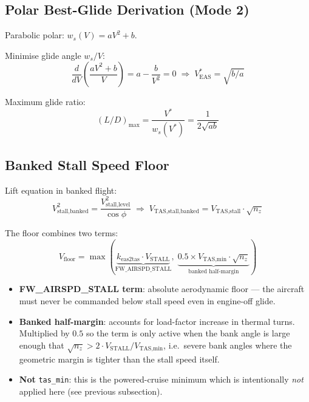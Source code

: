 \documentclass[12pt,a4paper]{article}
\begin{document}
\subsection{Polar Best-Glide Derivation (Mode 2)}

Parabolic polar: $w_s(V) = aV^2 + b$.

Minimise glide angle $w_s/V$:
\begin{equation}
  \frac{d}{dV}\!\left(\frac{aV^2+b}{V}\right) = a - \frac{b}{V^2} = 0
  \;\Rightarrow\;
  \boxed{V^*_{\text{EAS}} = \sqrt{b/a}}
\end{equation}

Maximum glide ratio:
\begin{equation}
  (L/D)_{\max} = \frac{V^*}{w_s(V^*)} = \frac{1}{2\sqrt{ab}}
\end{equation}

\subsection{Banked Stall Speed Floor}

Lift equation in banked flight:
\begin{equation}
  V^2_{\text{stall,banked}} = \frac{V^2_{\text{stall,level}}}{\cos\phi}
  \;\Rightarrow\;
  V_{\text{TAS,stall,banked}} = V_{\text{TAS,stall}} \cdot \sqrt{n_z}
\end{equation}

The floor combines two terms:
\begin{equation}
  V_{\text{floor}} = \max\!\left(
      \underbrace{k_{\text{eas2tas}} \cdot V_{\text{STALL}}}_{\text{FW\_AIRSPD\_STALL}},\;
      \underbrace{0.5 \times V_{\text{TAS,min}} \cdot \sqrt{n_z}}_{\text{banked half-margin}}
  \right)
\end{equation}

\begin{itemize}
  \item \textbf{FW\_AIRSPD\_STALL term}: absolute aerodynamic floor — the aircraft
        must never be commanded below stall speed even in engine-off glide.
  \item \textbf{Banked half-margin}: accounts for load-factor increase in thermal
        turns. Multiplied by $0.5$ so the term is only active when the bank angle
        is large enough that $\sqrt{n_z} > 2 \cdot V_{\text{STALL}} / V_{\text{TAS,min}}$,
        i.e.\ severe bank angles where the geometric margin is tighter than the
        stall speed itself.
  \item \textbf{Not} \texttt{tas\_min}: this is the powered-cruise minimum which is
        intentionally \emph{not} applied here (see previous subsection).
\end{itemize}
\end{document}
